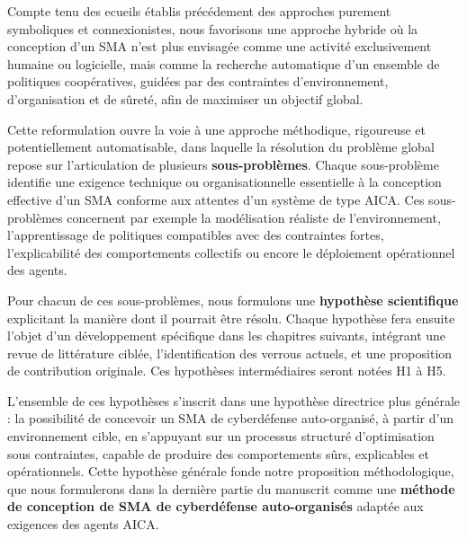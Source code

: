 \documentclass[ twoside,openright,titlepage,numbers=noenddot,headinclude,%
                footinclude=true,cleardoublepage=empty,abstractoff, %
                BCOR=5mm,paper=a4,fontsize=11pt,%
                french,american,%
                ]{scrreprt}
\begin{document}

Compte tenu des ecueils établis précédement des approches purement symboliques et connexionistes, nous favorisons une approche hybride où la conception d'un SMA n'est plus envisagée comme une activité exclusivement humaine ou logicielle, mais comme la recherche automatique d'un ensemble de politiques coopératives, guidées par des contraintes d'environnement, d'organisation et de sûreté, afin de maximiser un objectif global.

Cette reformulation ouvre la voie à une approche méthodique, rigoureuse et potentiellement automatisable, dans laquelle la résolution du problème global repose sur l'articulation de plusieurs \textbf{sous-problèmes}. Chaque sous-problème identifie une exigence technique ou organisationnelle essentielle à la conception effective d'un SMA conforme aux attentes d'un système de type AICA. Ces sous-problèmes concernent par exemple la modélisation réaliste de l'environnement, l'apprentissage de politiques compatibles avec des contraintes fortes, l'explicabilité des comportements collectifs ou encore le déploiement opérationnel des agents.

Pour chacun de ces sous-problèmes, nous formulons une \textbf{hypothèse scientifique} explicitant la manière dont il pourrait être résolu. Chaque hypothèse fera ensuite l'objet d'un développement spécifique dans les chapitres suivants, intégrant une revue de littérature ciblée, l'identification des verrous actuels, et une proposition de contribution originale. Ces hypothèses intermédiaires seront notées H1 à H5.

L'ensemble de ces hypothèses s'inscrit dans une hypothèse directrice plus générale : la possibilité de concevoir un SMA de cyberdéfense auto-organisé, à partir d'un environnement cible, en s'appuyant sur un processus structuré d'optimisation sous contraintes, capable de produire des comportements sûrs, explicables et opérationnels. Cette hypothèse générale fonde notre proposition méthodologique, que nous formulerons dans la dernière partie du manuscrit comme une \textbf{méthode de conception de SMA de cyberdéfense auto-organisés} adaptée aux exigences des agents AICA.
\end{document}
